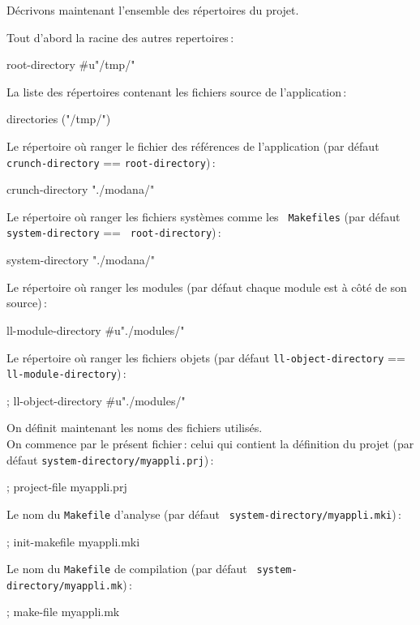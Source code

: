 D\'{e}crivons maintenant l'ensemble des r\'{e}pertoires du projet.

Tout d'abord la racine des autres repertoires\,:
\begin{Code*}
        root-directory #u"/tmp/"
\end{Code*}
La liste des r\'{e}pertoires contenant les fichiers source de l'application\,:
\begin{Code*}
        directories ("/tmp/")
\end{Code*}

Le r\'{e}pertoire o\`{u} ranger le fichier des r\'{e}f\'{e}rences de l'application
(par d\'{e}faut {\tt crunch-directory} == {\tt root-directory})\,:
\begin{Code*}
        crunch-directory "./modana/" 
\end{Code*}

Le r\'{e}pertoire o\`{u} ranger les fichiers syst\`{e}mes comme les {\tt
Makefiles} (par d\'{e}faut {\tt system-directory} == {\tt
root-directory})\,: 
\begin{Code*}
        system-directory "./modana/" 
\end{Code*}

Le r\'{e}pertoire o\`{u} ranger les modules
(par d\'{e}faut chaque module est \`{a} c\^{o}t\'{e} de son source)\,:
\begin{Code*}
        ll-module-directory #u"./modules/"
\end{Code*}

Le r\'{e}pertoire o\`{u} ranger les fichiers objets
(par d\'{e}faut {\tt ll-object-directory} == {\tt ll-module-directory})\,:
\begin{Code*}
        ; ll-object-directory #u"./modules/"
\end{Code*}

On d\'{e}finit maintenant les noms des fichiers utilis\'{e}s.\\

On commence par le pr\'{e}sent fichier\,: celui qui contient la
d\'{e}finition du projet (par d\'{e}faut {\tt system-directory/myappli.prj})\,:
\begin{Code*}
        ; project-file myappli.prj
\end{Code*}

Le nom du {\tt Makefile} d'analyse (par d\'{e}faut {\tt
system-directory/myappli.mki})\,:
\begin{Code*}
        ; init-makefile myappli.mki
\end{Code*}

Le nom du {\tt Makefile} de compilation (par d\'{e}faut {\tt
system-directory/myappli.mk})\,: 
\begin{Code*}
        ; make-file myappli.mk
\end{Code*}

